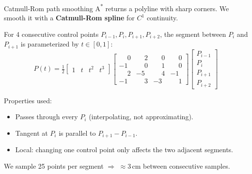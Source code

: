\documentclass[10pt,aspectratio=169]{beamer}
\begin{document}
\begin{frame}{Catmull-Rom path smoothing}
  A\textsuperscript{*} returns a polyline with sharp corners.
  We smooth it with a \textbf{Catmull-Rom spline} for $C^1$ continuity.

  \medskip
  For 4 consecutive control points $P_{i-1}, P_i, P_{i+1}, P_{i+2}$,
  the segment between $P_i$ and $P_{i+1}$ is parameterized by $t \in [0,1]$:
  \[
    P(t) = \tfrac{1}{2}
    \begin{bmatrix} 1 & t & t^2 & t^3 \end{bmatrix}
    \begin{bmatrix}
      \phantom{-}0 & \phantom{-}2 & \phantom{-}0 & \phantom{-}0 \\
      -1 & \phantom{-}0 & \phantom{-}1 & \phantom{-}0 \\
      \phantom{-}2 & -5 & \phantom{-}4 & -1 \\
      -1 & \phantom{-}3 & -3 & \phantom{-}1
    \end{bmatrix}
    \begin{bmatrix} P_{i-1} \\ P_i \\ P_{i+1} \\ P_{i+2}\end{bmatrix}
  \]

  Properties used:
  \begin{itemize}
    \item Passes through every $P_i$ (interpolating, not approximating).
    \item Tangent at $P_i$ is parallel to $P_{i+1} - P_{i-1}$.
    \item Local: changing one control point only affects the two adjacent segments.
  \end{itemize}

  \medskip
  We sample 25 points per segment $\Rightarrow$ $\approx 3$\,cm between consecutive samples.
\end{frame}
\end{document}
